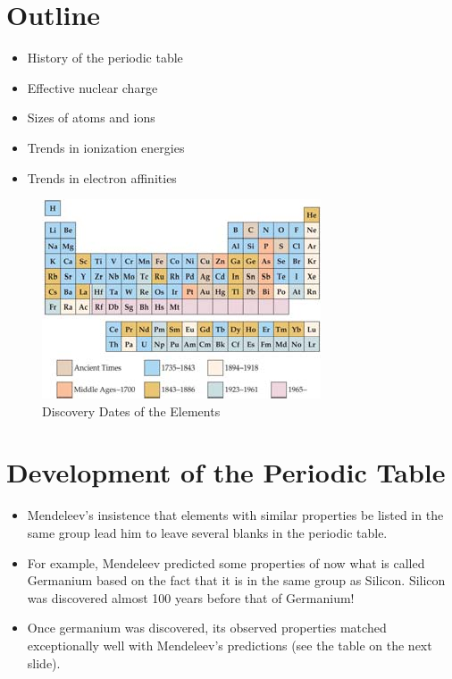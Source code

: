 \documentclass[
	chapter=8,
	title={Periodic Properties of the Elements},
	showanswers=true,
]{chem122notes}
\begin{document}
\section{Outline}\label{sec:outline-8}
\begin{itemize}
	\item History of the periodic table
	\item Effective nuclear charge
	\item Sizes of atoms and ions
	\item Trends in ionization energies
	\item Trends in electron affinities
\end{itemize}

\begin{figure}[H]
	\centering
	\includegraphics[width=\textwidth]{chapter8/periodic-table-dates}
	\caption{Discovery Dates of the Elements}
	\label{fig:periodic-table-dates}
\end{figure}

\section{Development of the Periodic Table}\label{sec:development-of-the-periodic-table}
\begin{itemize}
	\item Mendeleev's insistence that elements with similar properties be listed in the same group lead him to leave several blanks in the periodic table.
	\item For example, Mendeleev predicted some properties of now what is called Germanium based on the fact that it is in the same group as Silicon.
	Silicon was discovered almost 100 years before that of Germanium!
	\item Once germanium was discovered, its observed properties matched exceptionally well with Mendeleev's predictions (see the table on the next slide).
\end{itemize}
\end{document}
